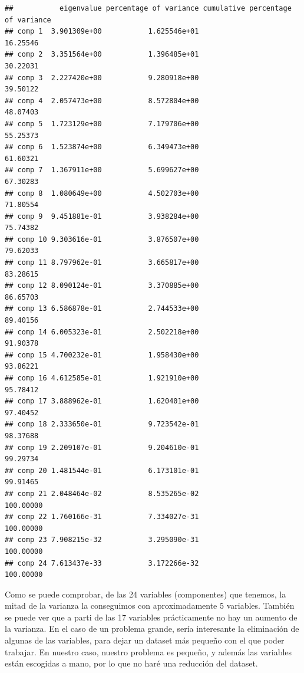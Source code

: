\documentclass[]{article}
\begin{document}
\begin{verbatim}
##           eigenvalue percentage of variance cumulative percentage of variance
## comp 1  3.901309e+00           1.625546e+01                          16.25546
## comp 2  3.351564e+00           1.396485e+01                          30.22031
## comp 3  2.227420e+00           9.280918e+00                          39.50122
## comp 4  2.057473e+00           8.572804e+00                          48.07403
## comp 5  1.723129e+00           7.179706e+00                          55.25373
## comp 6  1.523874e+00           6.349473e+00                          61.60321
## comp 7  1.367911e+00           5.699627e+00                          67.30283
## comp 8  1.080649e+00           4.502703e+00                          71.80554
## comp 9  9.451881e-01           3.938284e+00                          75.74382
## comp 10 9.303616e-01           3.876507e+00                          79.62033
## comp 11 8.797962e-01           3.665817e+00                          83.28615
## comp 12 8.090124e-01           3.370885e+00                          86.65703
## comp 13 6.586878e-01           2.744533e+00                          89.40156
## comp 14 6.005323e-01           2.502218e+00                          91.90378
## comp 15 4.700232e-01           1.958430e+00                          93.86221
## comp 16 4.612585e-01           1.921910e+00                          95.78412
## comp 17 3.888962e-01           1.620401e+00                          97.40452
## comp 18 2.333650e-01           9.723542e-01                          98.37688
## comp 19 2.209107e-01           9.204610e-01                          99.29734
## comp 20 1.481544e-01           6.173101e-01                          99.91465
## comp 21 2.048464e-02           8.535265e-02                         100.00000
## comp 22 1.760166e-31           7.334027e-31                         100.00000
## comp 23 7.908215e-32           3.295090e-31                         100.00000
## comp 24 7.613437e-33           3.172266e-32                         100.00000
\end{verbatim}

Como se puede comprobar, de las 24 variables (componentes) que tenemos,
la mitad de la varianza la conseguimos con aproximadamente 5 variables.
También se puede ver que a parti de las 17 variables prácticamente no
hay un aumento de la varianza. En el caso de un problema grande, sería
interesante la eliminación de algunas de las variables, para dejar un
dataset más pequeño con el que poder trabajar. En nuestro caso, nuestro
problema es pequeño, y además las variables están escogidas a mano, por
lo que no haré una reducción del dataset.
\end{document}
